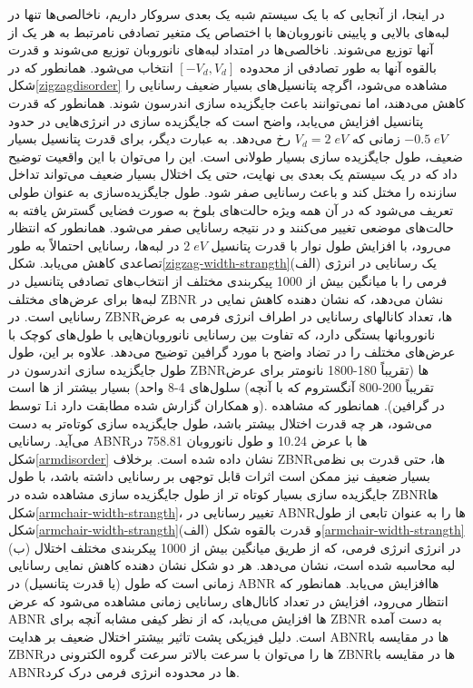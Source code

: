 در اینجا، از آنجایی که با یک سیستم شبه یک بعدی سروکار داریم، ناخالصی‌ها تنها در لبه‌های بالایی و پایینی نانوروبان‌ها با اختصاص یک متغیر تصادفی نامرتبط به هر یک از آنها توزیع ‌‌می‌‌شوند. ناخالصی‌ها در امتداد لبه‌های نانوروبان توزیع ‌‌می‌‌شوند و قدرت بالقوه آنها به طور تصادفی از محدوده $[-V_d, V_d]$ انتخاب ‌‌می‌‌شود. همانطور که در شکل\ref{zigzagdisorder} مشاهده ‌‌می‌‌شود، اگرچه پتانسیل‌های بسیار ضعیف رسانایی را کاهش ‌‌می‌‌دهند، اما نمی‌‌توانند باعث جایگزیده سازی اندرسون شوند. همانطور که قدرت پتانسیل افزایش ‌‌می‌‌یابد، واضح است که جایگزیده سازی در انرژی‌هایی در حدود $-0.5\;eV$ زمانی که $V_d = 2\;eV$ رخ ‌‌می‌‌دهد. به عبارت دیگر، برای قدرت پتانسیل بسیار ضعیف، طول جایگزیده سازی بسیار طولانی است. این را ‌‌می‌‌توان با این واقعیت توضیح داد که در یک سیستم یک بعدی بی نهایت، حتی یک اختلال بسیار ضعیف ‌‌می‌‌تواند تداخل سازنده را مختل کند و باعث رسانایی صفر شود. طول جایگزیده‌سازی به عنوان طولی تعریف ‌می‌شود که در آن همه ویژه حالت‌های بلوخ به صورت فضایی گسترش یافته به حالت‌های موضعی تغییر ‌می‌کنند و در نتیجه رسانایی صفر ‌می‌شود. همانطور که انتظار ‌‌می‌‌رود، با افزایش طول نوار با قدرت پتانسیل $2 \;eV$ در لبه‌ها، رسانایی احتمالاً به طور تصاعدی کاهش ‌می‌‌یابد. شکل\ref{zigzag-width-strangth}(الف) یک رسانایی در انرژی فر‌‌می‌‌ را با ‌میانگین بیش از 1000 پیکربندی مختلف از انتخاب‌های تصادفی پتانسیل در لبه‌ها برای عرض‌های مختلف \gls{ZBNR} نشان ‌‌می‌‌دهد، که نشان دهنده کاهش نمایی در رسانایی است. در \gls{ZBNR}ها، تعداد کانالهای رسانایی در اطراف انرژی فر‌‌می‌‌ به عرض نانوروبانها بستگی دارد، که تفاوت بین رسانایی نانوروبان‌ها‌یی با طول‌های کوچک با عرض‌های مختلف را در تضاد واضح با مورد گرافین توضیح ‌می‌دهد. علاوه بر این، طول طول جایگزیده سازی اندرسون در \gls{ZBNR}ها (تقریباً 180-1800 نانومتر برای عرض سلول‌های 4-8 واحد) بسیار بیشتر از ها است (تقریباً 200-800 آنگستروم که با آنچه توسط \gls{Li} و همکاران گزارش شده مطابقت دارد).\cite{Lee1985} در گرافین). همانطور که مشاهده ‌‌می‌‌شود، هر چه قدرت اختلال بیشتر باشد، طول جایگزیده سازی کوتاه‌تر به دست ‌‌می‌‌آید. رسانایی \gls{ABNR}ها با عرض \lr{\AA} 10.24 و طول نانوروبان \lr{\AA} 758.81 در شکل\ref{armdisorder} نشان داده شده است. برخلاف \gls{ZBNR}ها، حتی قدرت بی نظ‌‌می‌‌ بسیار ضعیف نیز ممکن است اثرات قابل توجهی بر رسانایی داشته باشد، با طول جایگزیده سازی بسیار کوتاه تر از طول جایگزیده سازی مشاهده شده در \gls{ZBNR}ها شکل\ref{armchair-width-strangth}، تغییر رسانایی در \gls{ABNR}ها را به عنوان تابعی از طول شکل\ref{armchair-width-strangth}(الف) و قدرت بالقوه شکل\ref{armchair-width-strangth}(ب) در انرژی انرژی فر‌می‌، که از طریق ‌میانگین بیش از 1000 پیکربندی مختلف اختلال لبه محاسبه شده است، نشان ‌‌می‌‌دهد. هر دو شکل نشان دهنده کاهش نمایی رسانایی زمانی است که طول (یا قدرت پتانسیل) در \gls{ABNR}‌ هاافزایش ‌‌می‌‌یابد. همانطور که انتظار ‌‌می‌‌رود، افزایش در تعداد کانال‌های رسانایی زمانی مشاهده ‌‌می‌‌شود که عرض \gls{ABNR}‌ ها افزایش ‌‌می‌‌یابد، که از نظر کیفی مشابه آنچه برای \gls{ZBNR} به دست آمده است. دلیل فیزیکی پشت تاثیر بیشتر اختلال ضعیف بر هدایت \gls{ABNR}ها در مقایسه با \gls{ZBNR}‌ها را ‌‌می‌‌توان با سرعت بالاتر سرعت گروه الکترونی در \gls{ZBNR}‌ها در مقایسه با \gls{ABNR}‌ها در محدوده انرژی فر‌‌می‌‌ درک کرد.

